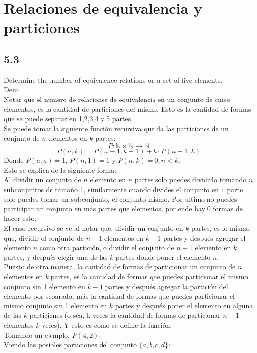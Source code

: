 \documentclass[11pt]{article}
\begin{document}
\section{Relaciones de equivalencia y particiones}
\subsection*{5.3}
Determine the number of equivalence relations on a set of five elements.\\
Dem:\\
Notar que el numero de relaciones de equivalencia en un conjunto de cinco elementos, es la cantidad de particiones del mismo. Esto es la cantidad de formas que se puede separar en 1,2,3,4 y 5 partes.\\
Se puede tomar la siguiente función recursiva que da las particiones de un conjunto de $n$ elementos en $k$ partes:
\[ P:\mathbb{N}\times\mathbb{N}\rightarrow\mathbb{N} \]
\[ P(n,k)=P(n-1,k-1)+k\cdot P(n-1,k)\]
Donde $P(a,a)=1$, $P(n,1)=1$ y $P(n,k)=0, n<k$.\\
Esto se explica de la siguiente forma:\\
Al dividir un conjunto de $n$ elemento en $n$ partes solo puedes dividirlo tomando $n$ subconjuntos de tamaño 1, similarmente cuando divides el conjunto en $1$ parte solo puedes tomar un subconjunto, el conjunto mismo. Por ultimo no puedes participar un conjunto en más partes que elementos, por ende hay 0 formas de hacer esto.\\
El caso recursivo se ve al notar que, dividir un conjunto en $k$ partes, es lo mismo que, dividir el conjunto de $n-1$ elementos en $k-1$ partes y después agregar el elemento $n$ como otra partición, o dividir el conjunto de $n-1$ elemento en $k$ partes, y después elegir una de las $k$ partes donde poner el elemento $n$.\\
Puesto de otra manera, la cantidad de formas de particionar un conjunto de $n$ elementos en $k$ partes, es la cantidad de formas que puedes particionar el mismo conjunto sin 1 elemento en $k-1$ partes y después agregar la partición del elemento por separado, más la cantidad de formas que puedes particionar el mismo conjunto sin 1 elemento en $k$ partes y después poner el elemento en alguna de las $k$ particiones (o sea, k veces la cantidad de formas de particionar $n-1$ elementos $k$ veces). Y esto es como se define la función.\\
Tomando un ejemplo, $P(4,2):$\\
Viendo las posibles particiones del conjunto $\{a,b,c,d\}$:
\end{document}
